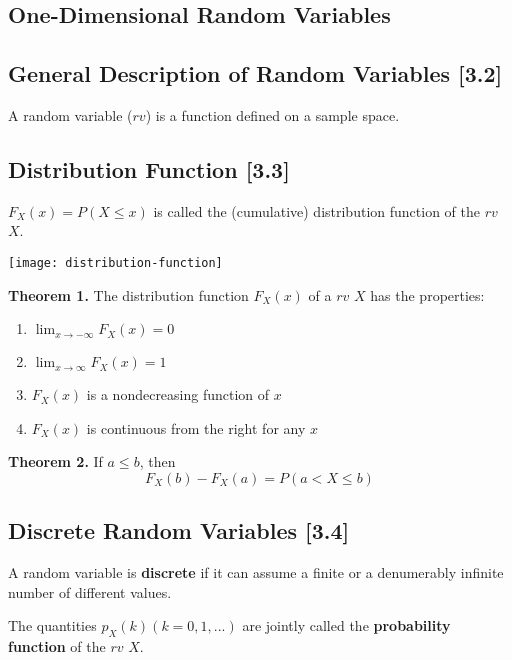 \documentclass[a4paper,9pt]{extarticle}
\begin{document}
\begin{multicols*}{2}
\section{One-Dimensional Random Variables}
\subsection{General Description of Random Variables [3.2]}
A random variable ($rv$) is a function defined on a sample space.

\subsection{Distribution Function [3.3]}
$F_X(x) = P(X  \leq x)$ is called the (cumulative) distribution function of the $rv$ $X$.

{\centering \texttt{[image: distribution-function]} \par}

\textbf{Theorem 1.} The distribution function $F_X(x)$ of a $rv$ $X$ has the properties:
\begin{enumerate}[label=\bfseries \arabic*.]
    \item $\lim_{x \to -\infty} F_X(x) = 0$
    \item $\lim_{x \to \infty} F_X(x) = 1$
    \item $F_X(x)$ is a nondecreasing function of $x$
    \item $F_X(x)$ is continuous from the right for any $x$
\end{enumerate}

\textbf{Theorem 2.} If $a \leq b$, then
\begin{equation} \label{3.3.1}
    F_X(b) - F_X(a) = P(a < X \leq b)
\end{equation}

\subsection{Discrete Random Variables [3.4]}
A random variable is \textbf{discrete} if it can assume a finite or a denumerably infinite number of different values.

The quantities $p_X(k) (k = 0, 1, ...)$ are jointly called the \textbf{probability function} of the $rv$ $X$.


\end{multicols*}
\end{document}
